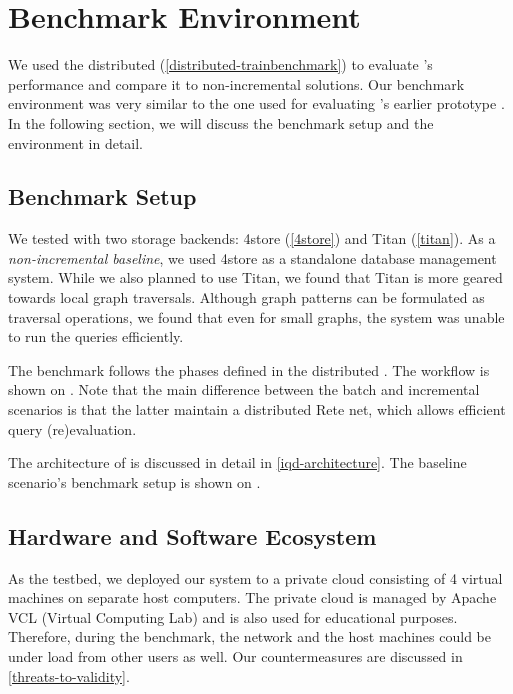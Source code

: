 \section{Benchmark Environment}
\label{sec:benchmark-environment}

We used the distributed \tb{} (\autoref{distributed-trainbenchmark}) to evaluate \iqd{}'s performance and compare it to non-incremental solutions. Our benchmark environment was very similar to the one used for evaluating \iqd{}'s earlier prototype \cite{Izso:2013:IIG:2487766.2487772}. In the following section, we will discuss the benchmark setup and the environment in detail.

\subsection{Benchmark Setup}

We tested \iqd{} with two storage backends: 4store (\autoref{4store}) and Titan (\autoref{titan}). As a \emph{non-incremental baseline}, we used 4store as a standalone database management system. While we also planned to use Titan, we found that Titan is more geared towards local graph traversals. Although graph patterns can be formulated as traversal operations, we found that even for small graphs, the system was unable to run the queries efficiently.


The benchmark follows the phases defined in the distributed \tb{}. The workflow is shown on . Note that the main difference between the batch and incremental scenarios is that the latter maintain a distributed Rete net, which allows efficient query (re)evaluation.   

The architecture of \iqd{} is discussed in detail in \autoref{iqd-architecture}. The baseline scenario's benchmark setup is shown on .


\subsection{Hardware and Software Ecosystem}
\label{ecosystem}

As the testbed, we deployed our system to a private cloud consisting of 4 virtual machines on separate host computers. The private cloud is managed by Apache VCL (Virtual Computing Lab) and is also used for educational purposes. Therefore, during the benchmark, the network and the host machines could be under load from other users as well. Our countermeasures are discussed in \autoref{threats-to-validity}.

